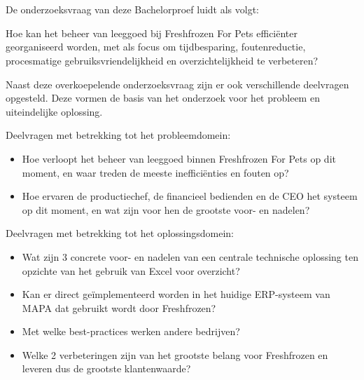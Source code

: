 \section{}%
\label{sec:onderzoeksvraag}
De onderzoeksvraag van deze Bachelorproef luidt als volgt:

Hoe kan het beheer van leeggoed bij Freshfrozen For Pets efficiënter georganiseerd worden, met als focus om tijdbesparing, foutenreductie, procesmatige gebruiksvriendelijkheid en overzichtelijkheid te verbeteren?

Naast deze overkoepelende onderzoeksvraag zijn er ook verschillende deelvragen opgesteld. Deze vormen de basis van het onderzoek voor het probleem en uiteindelijke oplossing.

Deelvragen met betrekking tot het probleemdomein:

\begin{itemize}
    \item Hoe verloopt het beheer van leeggoed binnen Freshfrozen For Pets op dit moment, en waar treden de meeste inefficiënties en fouten op?
    \item Hoe ervaren de productiechef, de financieel bedienden en de CEO het systeem op dit moment, en wat zijn voor hen de grootste voor- en nadelen?
\end{itemize}

Deelvragen met betrekking tot het oplossingsdomein:

\begin{itemize}
    \item Wat zijn 3 concrete voor- en nadelen van een centrale technische oplossing ten opzichte van het gebruik van Excel voor overzicht?
    \item Kan er direct geïmplementeerd worden in het huidige ERP-systeem van MAPA dat gebruikt wordt door Freshfrozen?
    \item Met welke best-practices werken andere bedrijven?
    \item Welke 2 verbeteringen zijn van het grootste belang voor Freshfrozen en leveren dus de grootste klantenwaarde?
\end{itemize}


\section{}%
\label{sec:onderzoeksdoelstelling}

